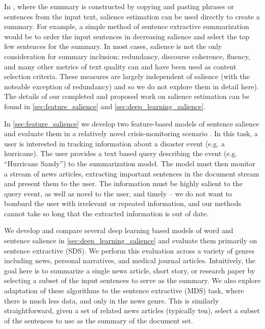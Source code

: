 In , 
where the summary is constructed by copying and pasting phrases or sentences 
from the input text, salience estimation can be used directly to create
a summary. For example, a simple method of sentence extractive summarization
would be to order the input sentences in decreasing salience and select the
top few sentences for the summary. In most cases, salience is not the only
consideration for summary inclusion; redundancy, discourse coherence, fluency,
and many other metrics of text quality can and have been used as content
selection criteria. These measures are largely independent of salience 
(with the noteable exception of redundancy) and so we do not explore them in 
detail here). The details of our completed and proposed work on 
salience estimation can be found
in \autoref{sec:feature_salience} and \autoref{sec:deep_learning_salience}.

In \autoref{sec:feature_salience} we develop two feature-based models of 
sentence
salience and evaluate them in a relatively novel  crisis-monitoring scenario
\citep{starbird2013working,aslam2016trec}. In this task, a user is interested
in tracking information about a disaster event (e.g. a hurricane). The
user provides a text based query describing the event 
(e.g. ``Hurricane Sandy'') to the summarization model. 
The model must then 
monitor a stream of news articles, extracting important sentences in the 
document stream and present them to the user. The information must be 
highly salient to the query event, as well as novel to the user, and timely
-- we do not want to bombard the user with irrelevant or repeated information,
and our methods cannot take so long  that the extracted
information is out of date.
  
We develop and compare several deep learning based models of word and 
sentence salience in \autoref{sec:deep_learning_salience} and evaluate them 
primarily on
sentence extractive  (SDS). 
We perform this evaluation across
a variety of genres including news, personal narratives, and medical journal
articles. Intuitively, the goal here is to summarize a single news article, 
short story, or research paper by selecting a subset of the input sentences
to serve as the summary. We also explore adaptation of these algorithms to 
the sentence extractive  (MDS) task, 
where there is much less data, and only in the news genre.
This is similarly straightforward, given a set of related news articles 
(typically ten), select a subset of the sentences to use as the summary of
the document set.


